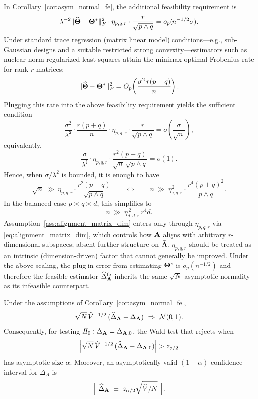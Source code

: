 \documentclass[authoryear,preprint,review,12pt]{elsarticle}
\begin{document}
	\begin{remark}\label{rem:scaling_fe}
		In Corollary~\ref{cor:asym_normal_fe}, the additional feasibility requirement is
		\[
		\lambda^{-2}\|\widehat{\mathbf{\Theta}}-\mathbf{\Theta}^\ast\|_F^2\cdot \eta_{p,q,r}\cdot\frac{r}{\sqrt{p\wedge q}}
		=o_p(n^{-1/2}\sigma).
		\]
		Under standard trace regression (matrix linear model) conditions—e.g., sub-Gaussian designs and a suitable restricted strong convexity—estimators such as nuclear-norm regularized least squares attain the minimax-optimal Frobenius rate for rank-$r$ matrices:
		\[
		\|\widehat{\mathbf{\Theta}}-\mathbf{\Theta}^\ast\|_F^2
		=O_p\!\left(\frac{\sigma^2\,r(p+q)}{n}\right).
		\]
		Plugging this rate into the above feasibility requirement yields the sufficient condition
		\[
		\frac{\sigma^2}{\lambda^{2}}\cdot \frac{r(p+q)}{n}\cdot \eta_{p,q,r}\cdot\frac{r}{\sqrt{p\wedge q}}
		=o\!\left(\frac{\sigma}{\sqrt{n}}\right),
		\]
		equivalently,
		\[
		\frac{\sigma}{\lambda^{2}}\cdot \eta_{p,q,r}\cdot
		\frac{r^2(p+q)}{\sqrt{n}\,\sqrt{p\wedge q}}
		=o(1).
		\]
		Hence, when $\sigma/\lambda^{2}$ is bounded, it is enough to have
		\[
		\sqrt{n}\ \gg\ \eta_{p,q,r}\cdot \frac{r^2(p+q)}{\sqrt{p\wedge q}}
		\qquad\Longleftrightarrow\qquad
		n\ \gg\ \eta_{p,q,r}^{\,2}\cdot \frac{r^4(p+q)^2}{p\wedge q}.
		\]
		In the balanced case $p\asymp q\asymp d$, this simplifies to
		\[
		n\ \gg\ \eta_{d,d,r}^{\,2}\, r^{4} d.
		\]
		Assumption~\ref{ass:alignment_matrix_dim} enters only through $\eta_{p,q,r}$ via
		\eqref{eq:alignment_matrix_dim}, which controls how $\bar{\mathbf{A}}$ aligns with arbitrary
		$r$-dimensional subspaces; absent further structure on $\bar{\mathbf{A}}$, $\eta_{p,q,r}$ should be treated
		as an intrinsic (dimension-driven) factor that cannot generally be improved. Under the above scaling,
		the plug-in error from estimating $\mathbf{\Theta}^\ast$ is $o_p(n^{-1/2})$ and therefore the feasible
		estimator $\widehat{\Delta}_{\mathbf{A}}^{\mathrm{fe}}$ inherits the same $\sqrt{N}$-asymptotic normality
		as its infeasible counterpart.
	\end{remark}
 
	

	{
		\begin{cor}\label{cor:wald-tensor}
			Under the assumptions of Corollary~\ref{cor:asym_normal_fe},
			\[
			\sqrt{N}\,\widehat V^{-1/2}\,(\widehat\Delta_{\mathbf{A}}-\Delta_{\mathbf{A}})\ \Rightarrow\ \mathcal N(0,1).
			\]
			Consequently, for testing $H_0:\Delta_{\mathbf{A}}=\Delta_{\mathbf{A},0}$, the Wald test that rejects when
			\[
			\Big|\sqrt{N}\,\widehat V^{-1/2}\,(\widehat\Delta_\bA-\Delta_{\bA,0})\Big|> z_{\alpha/2}
			\]
			has asymptotic size $\alpha$.
			Moreover, an asymptotically valid $(1-\alpha)$ confidence interval for $\Delta_A$ is
			\[
			\Big[\ \widehat\Delta_{\bA} \ \pm\ z_{\alpha/2}\sqrt{\widehat V/N}\ \Big].
			\]
		\end{cor} 
		
	}
	
\end{document}
